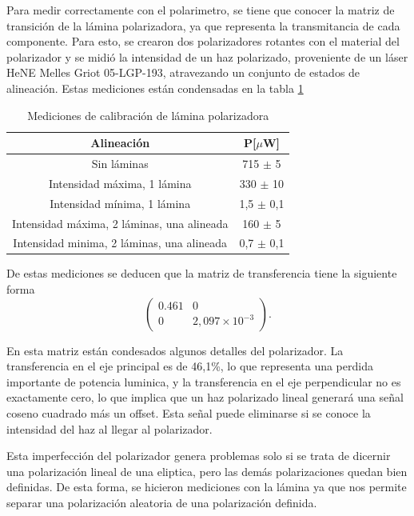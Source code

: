 Para medir correctamente con el polarimetro, se tiene que conocer la matriz de transición de la lámina polarizadora, ya que representa la transmitancia de cada componente. Para esto, se crearon dos polarizadores rotantes con el material del polarizador y se midió la intensidad de un haz polarizado, proveniente de un láser HeNE Melles Griot 05-LGP-193, atravezando un conjunto de estados de alineación. Estas mediciones están condensadas en la tabla \ref{tbl:polarimetro/calibracion}


\begin{table}[H]
    \centering
    \begin{tabular}{c|c}
        Alineación  & P[$\mu$W] \\ \hline
        Sin láminas & 715 $\pm$ 5  \\
        Intensidad máxima, 1 lámina  & 330 $\pm$ 10 \\
        Intensidad mínima, 1 lámina  & 1,5 $\pm$ 0,1 \\
        Intensidad máxima, 2 láminas, una alineada & 160 $\pm$ 5 \\
        Intensidad minima, 2 láminas, una alineada & 0,7 $\pm$ 0,1 \\
    \end{tabular}
    \caption{Mediciones de calibración de lámina polarizadora}
    \label{tbl:polarimetro/calibracion}
\end{table}

De estas mediciones se deducen que la matriz de transferencia tiene la siguiente forma
\begin{equation}
    \begin{pmatrix} 0.461 & 0 \\ 0 & 2,097\times10^{-3} \end{pmatrix}.
\end{equation}

En esta matriz están condesados algunos detalles del polarizador. La transferencia en el eje principal es de 46,1\%, lo que representa una perdida importante de potencia luminica, y la transferencia en el eje perpendicular no es exactamente cero, lo que implica que un haz polarizado lineal generará una señal coseno cuadrado más un offset. Esta señal puede eliminarse si se conoce la intensidad del haz al llegar al polarizador. 

Esta imperfección del polarizador genera problemas solo si se trata de dicernir una polarización lineal de una eliptica, pero las demás polarizaciones quedan bien definidas. De esta forma, se hicieron mediciones con la lámina ya que nos permite separar una polarización aleatoria de una polarización definida.

